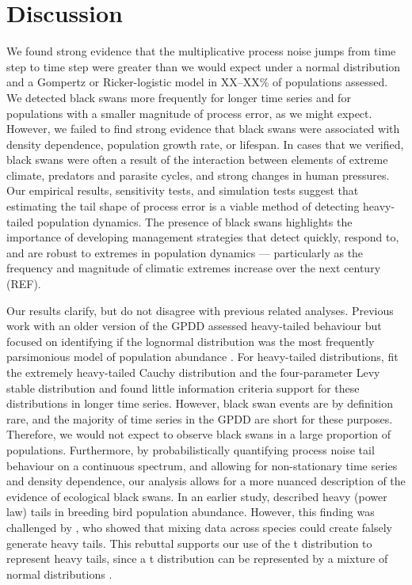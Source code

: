 \section{Discussion}

We found strong evidence that the multiplicative process noise jumps from time
step to time step were greater than we would expect under a normal distribution
and a Gompertz or Ricker-logistic model in XX--XX\% of populations assessed. We
detected black swans more frequently for longer time series and for populations
with a smaller magnitude of process error, as we might expect. However, we
failed to find strong evidence that black swans were associated with density
dependence, population growth rate, or lifespan. In cases that we verified,
black swans were often a result of the interaction between elements of extreme
climate, predators and parasite cycles, and strong changes in human pressures.
Our empirical results, sensitivity tests, and simulation tests suggest that
estimating the tail shape of process error is a viable method of detecting
heavy-tailed population dynamics. The presence of black swans highlights the
importance of developing management strategies that detect quickly, respond to,
and are robust to extremes in population dynamics --- particularly as the
frequency and magnitude of climatic extremes increase over the next century
(REF).

Our results clarify, but do not disagree with previous related analyses.
Previous work with an older version of the GPDD assessed heavy-tailed behaviour
but focused on identifying if the lognormal distribution was the most
frequently parsimonious model of population abundance \citep{halley2002}. For
heavy-tailed distributions, \citet{halley2002} fit the extremely heavy-tailed
Cauchy distribution and the four-parameter Levy stable distribution and found
little information criteria support for these distributions in longer time
series. However, black swan events are by definition rare, and the majority of
time series in the GPDD are short for these purposes. Therefore, we would not
expect to observe black swans in a large proportion of populations.
Furthermore, by probabilistically quantifying process noise tail behaviour on
a continuous spectrum, and allowing for non-stationary time series and density
dependence, our analysis allows for a more nuanced description of the evidence
of ecological black swans. In an earlier study, \citet{keitt1998} described
heavy (power law) tails in breeding bird population abundance. However, this
finding was challenged by \citet{allen2001}, who showed that mixing data across
species could create falsely generate heavy tails. This rebuttal supports our
use of the t distribution to represent heavy tails, since a t distribution can
be represented by a mixture of normal distributions \citep[with
inverse-gamma-distributed variances,][]{gelman2014}.

